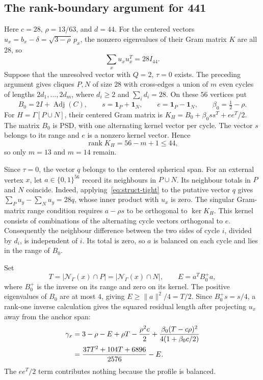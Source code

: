 \documentclass[11pt]{article}
\theoremstyle{remark}
\numberwithin{equation}{section}
\begin{document}
\subsection{The rank-boundary argument for 441}
\label{subsec:441-boundary}
Here $c=28$, $\rho=13/63$, and $d=44$.
For the centered vectors $u_x=b_x-\delta=\sqrt{3-\rho}\,p_x$, the nonzero eigenvalues
of their Gram matrix $K$ are all $28$, so
\begin{equation}\label{eq:struct-tight}
 \sum_xu_xu_x^T=28I_{44}.
\end{equation}
Suppose that the unresolved vector with $Q=2$, $\tau=0$ exists.
The preceding argument gives cliques $P,N$ of size $28$ with
cross-edges a union of $m$ even cycles of lengths
$2d_1,\ldots,2d_m$, where $d_i\ge2$ and $\sum_i d_i=28$.
On these $56$ vertices put
\[
 B_0=2I+\operatorname{Adj}(C),\qquad
 s=\mathbf1_P+\mathbf1_N,\qquad e=\mathbf1_P-\mathbf1_N,
 \qquad \beta_0=\tfrac12-\rho.
\]
For $H=\Gamma[P\cup N]$, their centered Gram matrix is
$K_H=B_0+\beta_0ss^T+ee^T/2$.
The matrix $B_0$ is PSD, with one alternating kernel vector per
cycle.  The vector $s$ belongs to its range and $e$ is a nonzero
kernel vector.  Hence
\[
 \operatorname{rank}K_H=56-m+1\le44,
\]
so only $m=13$ and $m=14$ remain.

Since $\tau=0$, the vector $q$ belongs to the centered spherical span.
For an external vertex $x$, let $a\in\{0,1\}^{56}$ record its
neighbours in $P\cup N$.  Its neighbour totals in $P$ and $N$
coincide.  Indeed, applying~\eqref{eq:struct-tight} to the putative
vector $q$ gives $\sum_Pu_y-\sum_Nu_y=28q$, whose inner product
with $u_x$ is zero. The singular Gram-matrix range condition
\cite[Appendix~A.5.5]{boyd} requires $a-\rho s$ to be orthogonal to
$\ker K_H$. This kernel consists of combinations of the
alternating cycle vectors orthogonal to $e$.  Consequently the
neighbour difference between the two sides of cycle $i$, divided
by $d_i$, is independent of $i$.  Its total is zero, so $a$ is
balanced on each cycle and lies in the range of $B_0$.

Set
\[
 T=|\mathcal N_\Gamma(x)\cap P|=|\mathcal N_\Gamma(x)\cap N|,
 \qquad E=a^TB_0^+a,
\]
where $B_0^+$ is the inverse on its range and zero on its kernel.
The positive eigenvalues of $B_0$ are at most $4$, giving
$E\ge\|a\|^2/4=T/2$.
Since $B_0^+s=s/4$, a rank-one inverse calculation gives the
squared residual length after projecting $u_x$ away from the
anchor span:
\begin{align}
 \gamma_x
 &=3-\rho-E+\rho T-\frac{\rho^2c}{2}
   +\frac{\beta_0(T-c\rho)^2}{4(1+\beta_0c/2)}\notag\\
 &=\frac{37T^2+104T+6896}{2576}-E.
 \label{eq:struct-441-height}
\end{align}
The $ee^T/2$ term contributes nothing because the profile is balanced.
\end{document}
